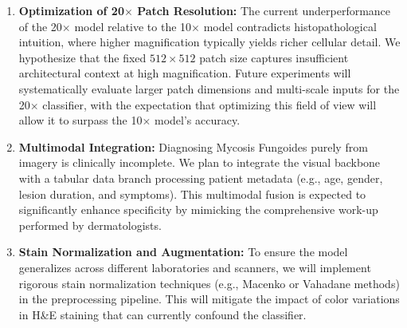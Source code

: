 \documentclass[conference]{IEEEtran}
\begin{document}
\begin{enumerate}
    \item \textbf{Optimization of 20$\times$ Patch Resolution:} The current underperformance of the 20$\times$ model relative to the 10$\times$ model contradicts histopathological intuition, where higher magnification typically yields richer cellular detail. We hypothesize that the fixed $512 \times 512$ patch size captures insufficient architectural context at high magnification. Future experiments will systematically evaluate larger patch dimensions and multi-scale inputs for the 20$\times$ classifier, with the expectation that optimizing this field of view will allow it to surpass the 10$\times$ model's accuracy.

    \item \textbf{Multimodal Integration:} Diagnosing Mycosis Fungoides purely from imagery is clinically incomplete. We plan to integrate the visual backbone with a tabular data branch processing patient metadata (e.g., age, gender, lesion duration, and symptoms). This multimodal fusion is expected to significantly enhance specificity by mimicking the comprehensive work-up performed by dermatologists.

    \item \textbf{Stain Normalization and Augmentation:} To ensure the model generalizes across different laboratories and scanners, we will implement rigorous stain normalization techniques (e.g., Macenko \cite{macenko2009} or Vahadane \cite{vahadane2016_stainnorm} methods) in the preprocessing pipeline. This will mitigate the impact of color variations in H\&E staining that can currently confound the classifier.

\end{enumerate}





\vspace{12pt}
\end{document}
